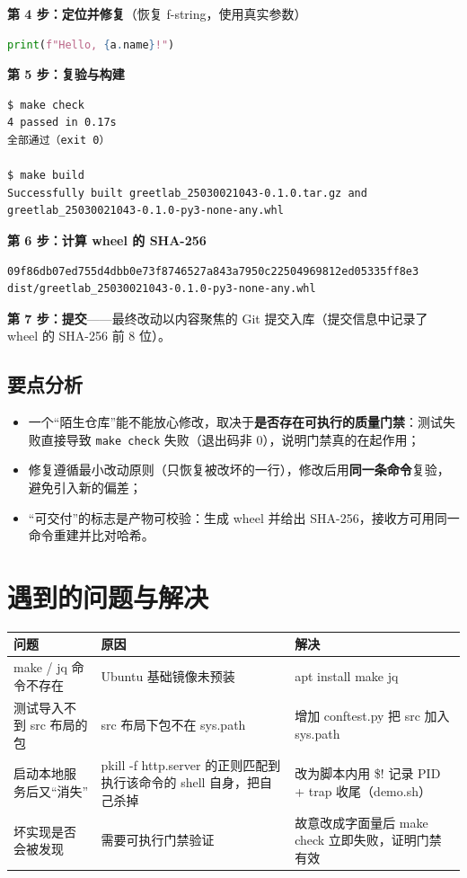 \documentclass[UTF8,fontset=ubuntu]{ctexart}
\begin{document}
\textbf{第 4 步：定位并修复}（恢复 f-string，使用真实参数）
\begin{lstlisting}[language=Python]
    print(f"Hello, {a.name}!")
\end{lstlisting}

\textbf{第 5 步：复验与构建}
\begin{lstlisting}
$ make check
4 passed in 0.17s
全部通过（exit 0）

$ make build
Successfully built greetlab_25030021043-0.1.0.tar.gz and greetlab_25030021043-0.1.0-py3-none-any.whl
\end{lstlisting}

\textbf{第 6 步：计算 wheel 的 SHA-256}
\begin{lstlisting}
09f86db07ed755d4dbb0e73f8746527a843a7950c22504969812ed05335ff8e3  dist/greetlab_25030021043-0.1.0-py3-none-any.whl
\end{lstlisting}

\textbf{第 7 步：提交}——最终改动以内容聚焦的 Git 提交入库（提交信息中记录了 wheel 的 SHA-256 前 8 位）。

\subsection{要点分析}
\begin{itemize}
\item 一个“陌生仓库”能不能放心修改，取决于\textbf{是否存在可执行的质量门禁}：测试失败直接导致 \lstinline|make check| 失败（退出码非 0），说明门禁真的在起作用；
\item 修复遵循最小改动原则（只恢复被改坏的一行），修改后用\textbf{同一条命令}复验，避免引入新的偏差；
\item “可交付”的标志是产物可校验：生成 wheel 并给出 SHA-256，接收方可用同一命令重建并比对哈希。
\end{itemize}

\section{遇到的问题与解决}
\begin{center}
\begin{tabular}{@{}p{4.6cm}p{5.2cm}p{5.4cm}@{}}
\toprule
问题 & 原因 & 解决 \\
\midrule
make / jq 命令不存在 & Ubuntu 基础镜像未预装 & apt install make jq \\
测试导入不到 src 布局的包 & src 布局下包不在 sys.path & 增加 conftest.py 把 src 加入 sys.path \\
启动本地服务后又“消失” & pkill -f http.server 的正则匹配到执行该命令的 shell 自身，把自己杀掉 & 改为脚本内用 \$! 记录 PID + trap 收尾（demo.sh） \\
坏实现是否会被发现 & 需要可执行门禁验证 & 故意改成字面量后 make check 立即失败，证明门禁有效 \\
\bottomrule
\end{tabular}
\end{center}
\end{document}
